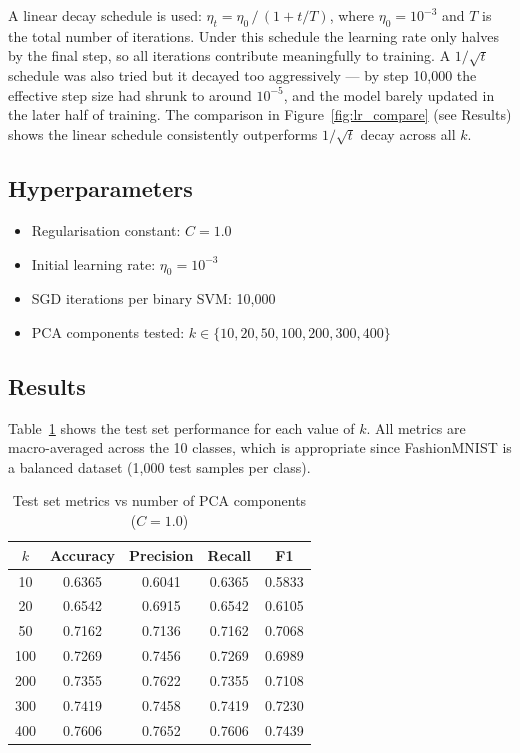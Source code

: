 \documentclass[12pt,a4paper]{article}
\begin{document}
A linear decay schedule is used: $\eta_t = \eta_0\,/\,(1 + t/T)$, where $\eta_0 = 10^{-3}$
and $T$ is the total number of iterations. Under this schedule the learning rate only
halves by the final step, so all iterations contribute meaningfully to training.
A $1/\sqrt{t}$ schedule was also tried but it decayed too aggressively — by step 10,000
the effective step size had shrunk to around $10^{-5}$, and the model barely updated
in the later half of training. The comparison in Figure~\ref{fig:lr_compare} (see Results)
shows the linear schedule consistently outperforms $1/\sqrt{t}$ decay across all $k$.

\subsection{Hyperparameters}

\begin{itemize}
    \item Regularisation constant: $C = 1.0$
    \item Initial learning rate: $\eta_0 = 10^{-3}$
    \item SGD iterations per binary SVM: 10,000
    \item PCA components tested: $k \in \{10, 20, 50, 100, 200, 300, 400\}$
\end{itemize}

\subsection{Results}

Table~\ref{tab:svm} shows the test set performance for each value of $k$.
All metrics are macro-averaged across the 10 classes, which is appropriate since
FashionMNIST is a balanced dataset (1,000 test samples per class).

\begin{table}[h]
\centering
\caption{Test set metrics vs number of PCA components ($C = 1.0$)}
\label{tab:svm}
\begin{tabular}{@{}ccccc@{}}
\toprule
$k$ & Accuracy & Precision & Recall & F1 \\
\midrule
10  & 0.6365 & 0.6041 & 0.6365 & 0.5833 \\
20  & 0.6542 & 0.6915 & 0.6542 & 0.6105 \\
50  & 0.7162 & 0.7136 & 0.7162 & 0.7068 \\
100 & 0.7269 & 0.7456 & 0.7269 & 0.6989 \\
200 & 0.7355 & 0.7622 & 0.7355 & 0.7108 \\
300 & 0.7419 & 0.7458 & 0.7419 & 0.7230 \\
400 & 0.7606 & 0.7652 & 0.7606 & 0.7439 \\
\bottomrule
\end{tabular}
\end{table}
\end{document}
